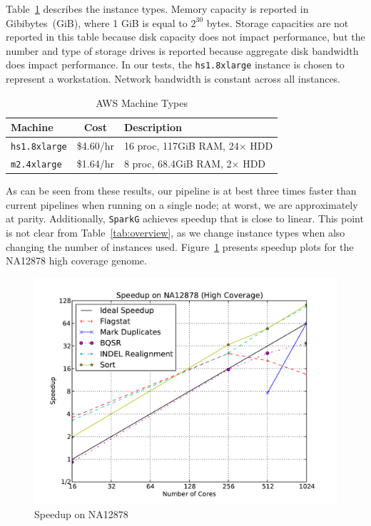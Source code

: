 \documentclass{acm_proc_article-sp}
\begin{document}
Table~\ref{tab:machines} describes the instance types. Memory capacity is reported in Gibibytes~(GiB),
where 1 GiB is equal to $2^{30}$ bytes. Storage capacities are not reported in this table because disk
capacity does not impact performance, but the number and type of storage drives is reported because
aggregate disk bandwidth does impact performance. In our tests, the \texttt{hs1.8xlarge} instance is
chosen to represent a workstation. Network bandwidth is constant across all instances.

\begin{table}[h]
\caption{AWS Machine Types}
\label{tab:machines}
\begin{tabular}{ l c l }
\hline
\bf Machine & \bf Cost & \bf Description \\
\hline
\hline
\texttt{hs1.8xlarge} & \$4.60/hr & 16 proc, 117GiB RAM, 24$\times$ HDD \\
\texttt{m2.4xlarge} & \$1.64/hr & 8 proc, 68.4GiB RAM, 2$\times$ HDD \\
\hline
\end{tabular}
\end{table}

As can be seen from these results, our pipeline is at best three times faster than current pipelines when running
on a single node; at worst, we are approximately at parity. Additionally, \texttt{SparkG} achieves speedup that is
close to linear. This point is not clear from Table~\ref{tab:overview}, as we change instance types when also
changing the number of instances used. Figure~\ref{fig:speedup} presents speedup plots for the NA12878 high
coverage genome.

\begin{figure}[h]
\begin{center}
\includegraphics[width=0.99\linewidth]{graphs/speedup_na12878.pdf}
\end{center}
\caption{Speedup on NA12878}
\label{fig:speedup}
\end{figure}
\end{document}
